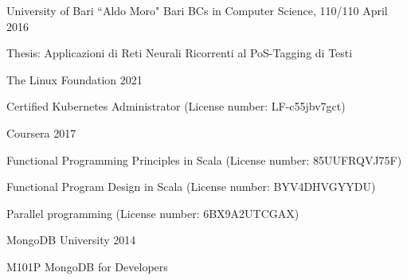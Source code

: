 \documentclass{resume} %
\begin{document}
\cvEntry
  {University of Bari ``Aldo Moro"}
  {Bari}
  {BCs in Computer Science, 110/110}
  {April 2016}{
    \begin{cvEntryItems}
      Thesis: Applicazioni di Reti Neurali Ricorrenti al PoS-Tagging di Testi
    \end{cvEntryItems}
  }





\cvEntry
  {The Linux Foundation}
  {2021}{}{}{
    \begin{cvEntryItems}
      \item Certified Kubernetes Administrator (License number: LF-c55jbv7gct)
    \end{cvEntryItems}
  }


\cvEntry
  {Coursera}
  {2017}{}{}{
    \begin{cvEntryItems}
      \item Functional Programming Principles in Scala (License number: 85UUFRQVJ75F)
      \item Functional Program Design in Scala (License number: BYV4DHVGYYDU)
      \item Parallel programming (License number: 6BX9A2UTCGAX)
    \end{cvEntryItems}
  }


\cvEntry
  {MongoDB University}
  {2014}{}{}{
    \begin{cvEntryItems}
      \item M101P MongoDB for Developers
    \end{cvEntryItems}
  }

\end{document}
